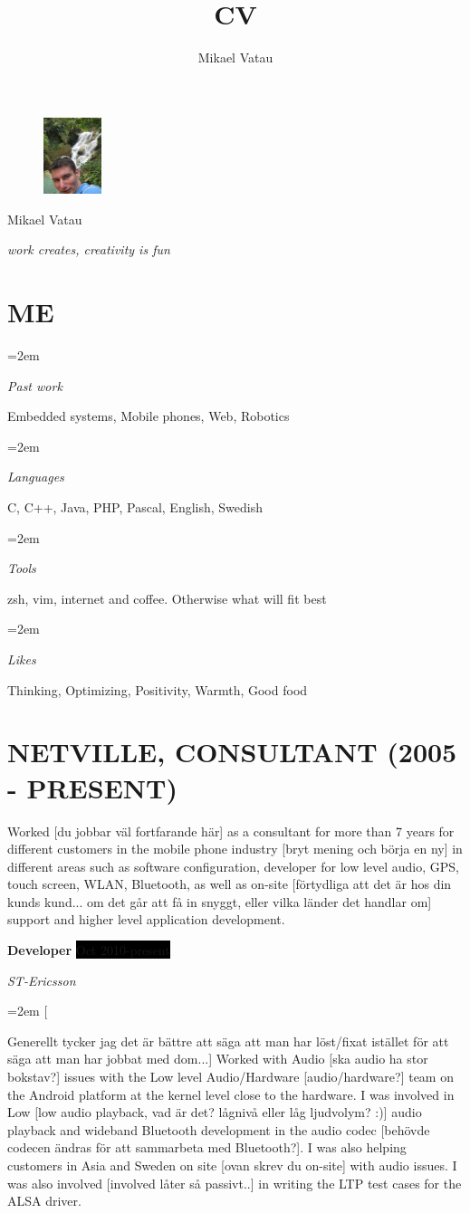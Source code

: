 \documentclass[paper=a4,fontsize=11pt]{scrartcl}
\author{Mikael Vatau}
\title{CV}
\newlength{\spacebox}
\newcommand{\sepspace}{\vspace*{1em}}
\newcommand{\MyName}[1]{
  \Huge \usefont{OT1}{phv}{b}{n} \hfill #1
  \par \normalsize \normalfont}
\newcommand{\MySlogan}[1]{
  \small \usefont{OT1}{phv}{m}{n}\hfill \textit{#1} %
  \par \normalsize \normalfont}
\newcommand{\NewPart}[1]{\section*{\uppercase{#1}}}
\newcommand{\PersonalEntry}[2]{
  \noindent\hangindent=2em\hangafter=0
  \parbox{\spacebox}{
    \textit{#1}}
    \hspace{1.5em} #2 \par}
\newcommand{\EducationEntry}[4]{
		\noindent \textbf{#1} \hfill 					%
		\colorbox{Black}{%
			\parbox{6em}{%
			\hfill\color{White}#2}} \par				%
		\noindent \textit{#3} \par					%
		\noindent\hangindent=2em\hangafter=0 \small #4 	%
		\normalsize \par}
\newcommand{\WorkEntry}[4]{						%
		\noindent \textbf{#1} \hfill 					%
		\colorbox{Black}{\color{White}#2} \par		%
		\noindent \textit{#3} \par					%
		\noindent\hangindent=2em\hangafter=0 \small #4 	%
		\normalsize \par}
\begin{document}
\begin{figure}
	\vspace*{-2em}
		\includegraphics[width=0.15\textwidth,natwidth=180,natheight=180]{mesmall.jpeg}
\end{figure}

\MyName{Mikael Vatau}
\MySlogan{work creates, creativity is fun} %

\sepspace

\NewPart{Me} %
\PersonalEntry{Past work}{Embedded systems, Mobile phones, Web, Robotics}
\PersonalEntry{Languages}{C, C++, Java, PHP, Pascal, English, Swedish}
\PersonalEntry{Tools}{zsh, vim, internet and coffee. Otherwise what will fit best}
\PersonalEntry{Likes}{Thinking, Optimizing, Positivity, Warmth, Good food}

\NewPart{Netville, consultant (2005 - present)}{Worked [du jobbar väl fortfarande här] as a consultant for more than 
  7 years for different customers in the mobile phone industry [bryt mening och börja en ny] in different areas such 
  as software configuration, developer for low level audio, GPS, touch screen, WLAN, 
  Bluetooth, as well as on-site [förtydliga att det är hos din kunds kund... om det går att få in snyggt, eller vilka länder det handlar om] support and higher level application development.}
\sepspace

\WorkEntry{Developer}{Oct 2010-present}{ST-Ericsson}
[Generellt tycker jag det är bättre att säga att man har löst/fixat istället för att säga att man har jobbat med dom...]
  {Worked with Audio [ska audio ha stor bokstav?] issues with the Low level Audio/Hardware [audio/hardware?] team on the Android platform 
  at the kernel level close to the hardware. I was involved in Low [low audio playback, vad är det? lågnivå eller låg ljudvolym? :)] audio playback and  
  wideband Bluetooth development in the audio codec [behövde codecen ändras för att sammarbeta med Bluetooth?]. I was also helping customers in Asia 
  and Sweden on site [ovan skrev du on-site] with audio issues. I was also involved [involved låter så passivt..] in writing the LTP test cases for 
  the ALSA driver.}
\sepspace
\end{document}
